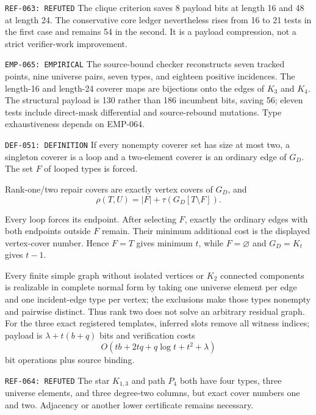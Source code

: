 \documentclass[11pt]{article}
\begin{document}
{\texttt{REF-063: REFUTED}}
The clique criterion saves 8 payload bits at length 16 and 48 at length 24.
The conservative core ledger nevertheless rises from 16 to 21 tests in the
first case and remains 54 in the second.  It is a payload compression, not a
strict verifier-work improvement.

{\texttt{EMP-065: EMPIRICAL}}
The source-bound checker reconstructs seven tracked points, nine universe
pairs, seven types, and eighteen positive incidences.  The length-16 and
length-24 coverer maps are bijections onto the edges of \(K_3\) and \(K_4\).
The structural payload is 130 rather than 186 incumbent bits, saving 56;
eleven tests include direct-mask differential and source-rebound mutations.
Type exhaustiveness depends on EMP-064.

{\texttt{DEF-051: DEFINITION}}
If every nonempty coverer set has size at most two, a singleton coverer is a
loop and a two-element coverer is an ordinary edge of \(G_D\).  The set \(F\)
of looped types is forced.

{}
Rank-one/two repair covers are exactly vertex covers of \(G_D\), and
\[
 \rho(T,U)=|F|+\tau\!\left(G_D[T\setminus F]\right).
\]

\begin{claimproof}
Every loop forces its endpoint.  After selecting \(F\), exactly the ordinary
edges with both endpoints outside \(F\) remain.  Their minimum additional
cost is the displayed vertex-cover number.  Hence \(F=T\) gives minimum
\(t\), while \(F=\varnothing\) and \(G_D=K_t\) gives \(t-1\).

Every finite simple graph without isolated vertices or \(K_2\) connected
components is realizable in complete normal form by taking one universe
element per edge and one incident-edge type per vertex; the exclusions make
those types nonempty and pairwise distinct. Thus rank two does not solve an
arbitrary residual graph. For the three exact registered templates, inferred
slots remove all witness indices; payload is \(\lambda+t(b+q)\) bits and
verification costs
\[
 O(tb+2tq+q\log t+t^2+\lambda)
\]
bit operations plus source binding.
\end{claimproof}

{\texttt{REF-064: REFUTED}}
The star \(K_{1,3}\) and path \(P_4\) both have four types, three universe
elements, and three degree-two columns, but exact cover numbers one and two.
Adjacency or another lower certificate remains necessary.
\end{document}
